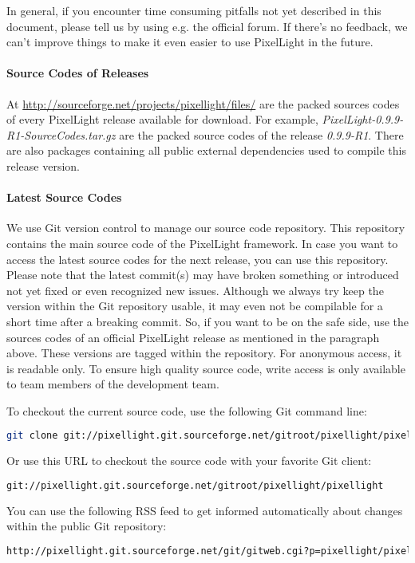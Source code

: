 In general, if you encounter time consuming pitfalls not yet described in this document, please tell us by using e.g. the official forum. If there's no feedback, we can't improve things to make it even easier to use PixelLight in the future.


\paragraph{Source Codes of Releases}
At \url{http://sourceforge.net/projects/pixellight/files/} are the packed sources codes of every PixelLight release available for download. For example, \emph{PixelLight-0.9.9-R1-SourceCodes.tar.gz} are the packed source codes of the release \emph{0.9.9-R1}. There are also packages containing all public external dependencies used to compile this release version.


\paragraph{Latest Source Codes}
We use Git version control to manage our source code repository. This repository contains the main source code of the PixelLight framework. In case you want to access the latest source codes for the next release, you can use this repository. Please note that the latest commit(s) may have broken something or introduced not yet fixed or even recognized new issues. Although we always try keep the version within the Git repository usable, it may even not be compilable for a short time after a breaking commit. So, if you want to be on the safe side, use the sources codes of an official PixelLight release as mentioned in the paragraph above. These versions are tagged within the repository. For anonymous access, it is readable only. To ensure high quality source code, write access is only available to team members of the development team.

To checkout the current source code, use the following Git command line:
\begin{lstlisting}[language=sh]
git clone git://pixellight.git.sourceforge.net/gitroot/pixellight/pixellight
\end{lstlisting}

Or use this \ac{URL} to checkout the source code with your favorite Git client:
\begin{lstlisting}[language=sh]
git://pixellight.git.sourceforge.net/gitroot/pixellight/pixellight
\end{lstlisting}

You can use the following RSS feed to get informed automatically about changes within the public Git repository:
\begin{lstlisting}[language=sh]
http://pixellight.git.sourceforge.net/git/gitweb.cgi?p=pixellight/pixellight;a=rss
\end{lstlisting}
